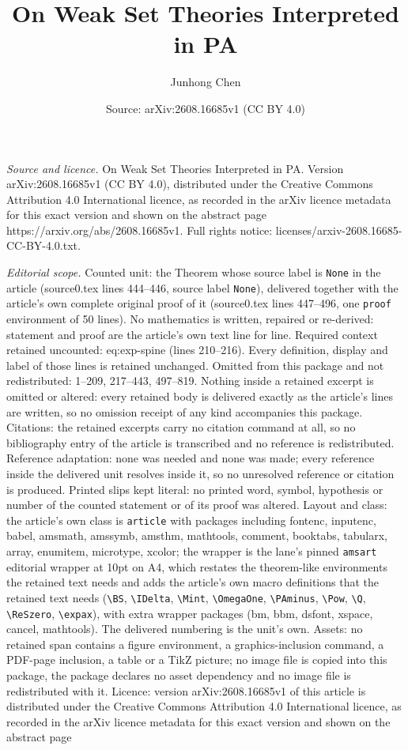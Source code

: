 \documentclass[10pt,a4paper]{amsart}
\title[On Weak Set Theories Interpreted in PA]{On Weak Set Theories Interpreted in PA}
\author{Junhong Chen}
\date{Source: arXiv:2608.16685v1 (CC BY 4.0)}
\begin{document}
\maketitle

\noindent\emph{Source and licence.} On Weak Set Theories Interpreted in PA. Version arXiv:2608.16685v1 (CC BY 4.0), distributed under the Creative Commons Attribution 4.0 International licence, as recorded in the arXiv licence metadata for this exact version and shown on the abstract page https://arxiv.org/abs/2608.16685v1. Full rights notice: licenses/arxiv-2608.16685-CC-BY-4.0.txt.\par\smallskip

\noindent\textit{Editorial scope.} Counted unit: the Theorem whose source label is \texttt{None} in the article (source0.tex lines 444--446, source label \texttt{None}), delivered together with the article's own complete original proof of it (source0.tex lines 447--496, one \texttt{proof} environment of 50 lines). No mathematics is written, repaired or re-derived: statement and proof are the article's own text line for line. Required context retained uncounted: eq:exp-spine (lines 210--216). Every definition, display and label of those lines is retained unchanged. Omitted from this package and not redistributed: 1--209, 217--443, 497--819. Nothing inside a retained excerpt is omitted or altered: every retained body is delivered exactly as the article's lines are written, so no omission receipt of any kind accompanies this package. Citations: the retained excerpts carry no citation command at all, so no bibliography entry of the article is transcribed and no reference is redistributed. Reference adaptation: none was needed and none was made; every reference inside the delivered unit resolves inside it, so no unresolved reference or citation is produced. Printed slips kept literal: no printed word, symbol, hypothesis or number of the counted statement or of its proof was altered. Layout and class: the article's own class is \texttt{article} with packages including fontenc, inputenc, babel, amsmath, amssymb, amsthm, mathtools, comment, booktabs, tabularx, array, enumitem, microtype, xcolor; the wrapper is the lane's pinned \texttt{amsart} editorial wrapper at 10pt on A4, which restates the theorem-like environments the retained text needs and adds the article's own macro definitions that the retained text needs (\texttt{\textbackslash BS}, \texttt{\textbackslash IDelta}, \texttt{\textbackslash Mint}, \texttt{\textbackslash OmegaOne}, \texttt{\textbackslash PAminus}, \texttt{\textbackslash Pow}, \texttt{\textbackslash Q}, \texttt{\textbackslash ReSzero}, \texttt{\textbackslash expax}), with extra wrapper packages (bm, bbm, dsfont, xspace, cancel, mathtools). The delivered numbering is the unit's own. Assets: no retained span contains a figure environment, a graphics-inclusion command, a PDF-page inclusion, a table or a TikZ picture; no image file is copied into this package, the package declares no asset dependency and no image file is redistributed with it. Licence: version arXiv:2608.16685v1 of this article is distributed under the Creative Commons Attribution 4.0 International licence, as recorded in the arXiv licence metadata for this exact version and shown on the abstract page 
\end{document}
